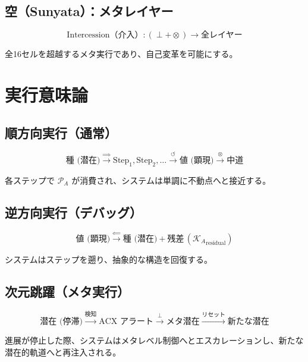 \documentclass[12pt,a4paper]{ujarticle}
\newcommand{\powa}{\mathcal{P}_A}    %
\newcommand{\kal}{\mathcal{K}_A}     %
\begin{document}
\subsection{空（Sunyata）：メタレイヤー}

\begin{equation}
\text{Intercession（介入）} : (\perp + \otimes) \to \text{全レイヤー}
\end{equation}

全16セルを超越するメタ実行であり、自己変革を可能にする。

\section{実行意味論}

\subsection{順方向実行（通常）}

\begin{equation}
\text{種 (潜在)} \xrightarrow{\Rightarrow} \text{Step}_1, \text{Step}_2, \ldots \xrightarrow{\circlearrowleft} \text{値 (顕現)} \xrightarrow{\otimes} \text{中道}
\end{equation}

各ステップで $\powa$ が消費され、システムは単調に不動点へと接近する。

\subsection{逆方向実行（デバッグ）}

\begin{equation}
\text{値 (顕現)} \xrightarrow{\Leftarrow} \text{種 (潜在)} + \text{残差} \, ({\kal}_{\text{residual}})
\end{equation}

システムはステップを遡り、抽象的な構造を回復する。

\subsection{次元跳躍（メタ実行）}

\begin{equation}
\text{潜在 (停滞)} \xrightarrow{\text{検知}} \text{ACX アラート} \xrightarrow{\perp} \text{メタ潜在} \xrightarrow{\text{リセット}} \text{新たな潜在}
\end{equation}

進展が停止した際、システムはメタレベル制御へとエスカレーションし、新たな潜在的軌道へと再注入される。
\end{document}
